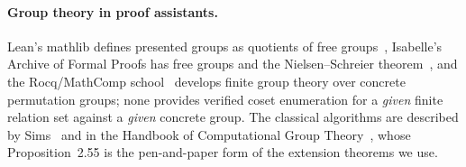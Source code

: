 \paragraph{Group theory in proof assistants.}
Lean's mathlib defines presented groups as quotients of free
groups~\cite{mathlib2020,mathlib-doc-presented}, Isabelle's Archive of
Formal Proofs has free groups and the Nielsen--Schreier
theorem~\cite{breitner2010freegroups,kharim2023freegroups}, and the
Rocq/MathComp school~\cite{gonthier2013oddorder} develops finite group
theory over concrete permutation groups; none provides verified coset
enumeration for a \emph{given} finite relation set against a
\emph{given} concrete group.  The classical algorithms are described by
Sims~\cite{sims1994computation} and in the Handbook of Computational
Group Theory~\cite{holt2005handbook}, whose Proposition~2.55 is the
pen-and-paper form of the extension theorems we use.
